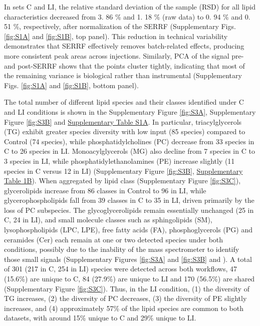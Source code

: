 \documentclass[10pt,letterpaper]{article}
\begin{document}
In sets C and LI, the relative standard deviation of the sample (RSD) for all lipid characteristics decreased from 3. 86 \% and 1. 18 \% (raw data)  to 0. 94 \% and 0. 51 \%, respectively, after normalization of the SERRF (Supplementary Figs. \ref{fig:S1A} and \ref{fig:S1B}, top panel). This reduction in technical variability demonstrates that SERRF effectively removes batch-related effects, producing more consistent peak areas across injections. Similarly, PCA of the signal pre- and post-SERRF shows that the points cluster tightly, indicating that most of the remaining variance is biological rather than instrumental (Supplementary Figs. \ref{fig:S1A} and \ref{fig:S1B}, bottom panel).


The total number of different lipid species and their classes identified under C and LI conditions is shown in the Supplementary Figure \ref{fig:S3A}, Supplementary Figure \ref{fig:S3B} and  \href{https://docs.google.com/spreadsheets/d/1SB90-QLYheKEzmHCUIh1UfgkrtbL064s8Oo5BfwFaV0/edit?gid=1876149577#gid=1876149577}{Supplementary Table S1A}. In particular, triacylglycerols (TG) exhibit greater species diversity with low input (85 species) compared to Control (74 species), while phosphatidylcholines (PC) decrease from 33 species in C to 26 species in LI. Monoacylglycerols (MG) also decline from 7 species in C to 3 species in LI, while phosphatidylethanolamines (PE) increase slightly (11 species in C versus 12 in LI) (Supplementary Figure \ref{fig:S3B}, \href{https://docs.google.com/spreadsheets/d/1SB90-QLYheKEzmHCUIh1UfgkrtbL064s8Oo5BfwFaV0/edit?gid=1876149577#gid=1876149577}{Supplementary Table 1B}). When aggregated by lipid class (Supplementary Figure \ref{fig:S3C}), glycerolipids increase from 86 classes in Control to 96 in LI, while glycerophospholipids fall from 39 classes in C to 35 in LI, driven primarily by the loss of PC subspecies. The glycoglycerolipids remain essentially unchanged (25 in C, 24 in LI), and small molecule classes such as sphingolipids (SM), lysophospholipids (LPC, LPE), free fatty acids (FA), phosphoglycerols (PG) and ceramides (Cer) each remain at one or two detected species under both conditions, possibly due to the inability of the mass spectrometer to identify those small signals (Supplementary Figures \ref{fig:S3A} and \ref{fig:S3B} and ). A total of 301 (217 in C, 254 in LI) species were detected across both workflows, 47 (15.6\%) are unique to C, 84 (27.9\%) are unique to LI and 170 (56.5\%) are shared (Supplementary Figure \ref{fig:S3C}). Thus, in the LI condition, (1) the diversity of TG increases, (2) the diversity of PC decreases, (3) the diversity of PE slightly increases, and (4) approximately 57\% of the lipid species are common to both datasets, with around 15\% unique to C and 29\% unique to LI.
\end{document}
